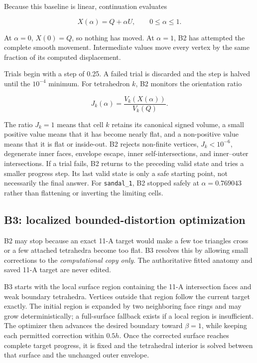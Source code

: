 \documentclass[11pt]{article}
\begin{document}
Because this baseline is linear, continuation evaluates

\begin{equation}
  X(\alpha)=Q+\alpha U,
  \qquad 0\le\alpha\le1.
  \label{eq:b2-continuation}
\end{equation}

At $\alpha=0$, $X(0)=Q$, so nothing has moved. At $\alpha=1$, B2 has attempted the
complete smooth movement. Intermediate values move every vertex by the same fraction of
its computed displacement.

Trials begin with a step of 0.25. A failed trial is discarded and the step is halved
until the $10^{-4}$ minimum. For tetrahedron $k$, B2 monitors the orientation ratio

\begin{equation}
  J_k(\alpha)=
  \frac{V_k(X(\alpha))}{V_k(Q)}.
\end{equation}

The ratio $J_k=1$ means that cell $k$ retains its canonical signed volume, a small
positive value means that it has become nearly flat, and a non-positive value means that
it is flat or inside-out. B2 rejects non-finite vertices, $J_k<10^{-6}$, degenerate
inner faces, envelope escape, inner self-intersections, and inner--outer intersections.
If a trial fails, B2 returns to the preceding valid state and tries a smaller progress
step. Its last valid state is only a safe starting point, not necessarily the final
answer. For \texttt{sandal\_1}, B2 stopped safely at $\alpha=0.769043$ rather than
flattening or inverting the limiting cells.

\subsection{B3: localized bounded-distortion optimization}

B2 may stop because an exact 11-A target would make a few toe triangles cross or a few
attached tetrahedra become too flat. B3 resolves this by allowing small corrections to
the \emph{computational copy only}. The authoritative fitted anatomy and saved 11-A
target are never edited.

B3 starts with the local surface region containing the 11-A intersection faces and weak
boundary tetrahedra. Vertices outside that region follow the current target exactly. The
initial region is expanded by two neighboring face rings and may grow deterministically;
a full-surface fallback exists if a local region is insufficient. The optimizer then
advances the desired boundary toward $\beta=1$, while keeping each permitted correction
within $0.5h$. Once the corrected surface reaches complete target progress, it is fixed
and the tetrahedral interior is solved between that surface and the unchanged outer
envelope.
\end{document}
